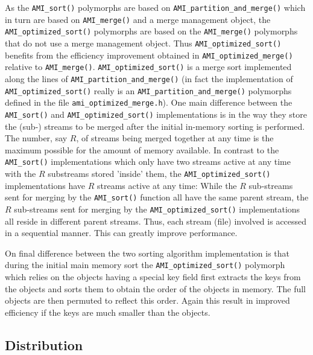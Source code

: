 As the \verb|AMI_sort()| polymorphs are based on
\verb|AMI_partition_and_merge()| which in turn are based on
\verb|AMI_merge()| and a merge management object, the
\verb|AMI_optimized_sort()| polymorphs are based on the \verb|AMI_merge()|
polymorphs that do not use a merge management object. Thus
\verb|AMI_optimized_sort()| benefits from the efficiency improvement
obtained in \verb|AMI_optimized_merge()| relative to
\verb|AMI_merge()|. \verb|AMI_optimized_sort()| is a merge sort implemented
along the lines of \verb|AMI_partition_and_merge()| (in fact the
implementation of \verb|AMI_optimized_sort()| really is an
\verb|AMI_partition_and_merge()| polymorphs defined in the file
\verb|ami_optimized_merge.h|). One main difference between the
\verb|AMI_sort()| and \verb|AMI_optimized_sort()| implementations is in the
way they store the (sub-) streams to be merged after the initial in-memory
sorting is performed. The number, say $R$, of streams being merged together
at any time is the maximum possible for the amount of memory available. In
contrast to the \verb|AMI_sort()| implementations which only have two
streams active at any time with the $R$ substreams stored 'inside' them,
the \verb|AMI_optimized_sort()| implementations have $R$ streams active at
any time: While the $R$ sub-streams sent for merging by the
\verb|AMI_sort()| function all have the same parent stream, the $R$
sub-streams sent for merging by the \verb|AMI_optimized_sort()|
implementations all reside in different parent streams. Thus, each stream
(file) involved is accessed in a sequential manner. This can greatly
improve performance.

On final difference between the two sorting algorithm implementation is
that during the initial main memory sort the \verb|AMI_optimized_sort()|
polymorph which relies on the objects having a special key field first
extracts the keys from the objects and sorts them to obtain the order of
the objects in memory. The full objects are then permuted to reflect this
order. Again this result in improved efficiency if the keys are much
smaller than the objects.




\subsection{Distribution}
\label{sec:ref-imp-ami-distribution}

